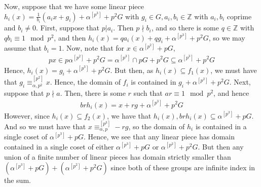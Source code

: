 \documentclass[a4paper,11pt]{article}
\newenvironment{claimproof}{\renewcommand{\qedsymbol}{$\blacksquare$}\proof} {\endproof} %
\newcommand{\nl}{\newline}
\begin{document}
\begin{claimproof}
    Now, suppose that we have some linear piece $h_i(x) = \frac{1}{b_i}(a_ix + 
    g_i) + \alpha^{[p^3]}+p^2G$ with $g_i\in G,a_i,b_i\in \mathbb{Z}$ with
    $a_i,b_i$ coprime and $b_i\neq 0$.
	\nl\nl
	First, suppose that $p|a_i$. Then $p\nmid b_i$, and so there is some $q\in 
    \mathbb{Z}$ with $qb_i \equiv 1 \mod p^2$, and then $h_i(x) = qa_i(x) + 
    qg_i + \alpha^{[p^3]}+p^2G$, so we may assume that $b_i = 1$. Now, note
    that for $x \in \alpha^{[p^2]}+pG$,
    \begin{align*}
        px \in p\alpha^{[p^2]}+p^2G = 
        \alpha^{[p^3]}\cap pG + p^2G \subseteq \alpha^{[p^3]}+p^2G
    \end{align*}
	Hence, $h_i(x) = g_i + \alpha^{[p^3]}+p^2G$. But then, as $h_i(x) 
    \subseteq f_1(x)$, we must have that $g_i \equiv_{\alpha, p^2}^{[p^2]} x$.
    Hence, the domain of $f_i$ is contained in $g_i + \alpha^{[p^2]}+p^2G$.
    \nl\nl
	Next, suppose that $p\nmid a$. Then, there is some $r$ such that $ar 
    \equiv 1 \mod p^2$, and hence
    \begin{align*}
        brh_i(x) = x + rg + \alpha^{[p^3]}+p^2G 
    \end{align*}
    \noindent However, since $h_i(x) \subseteq f_2(x)$, we have that
    $h_i(x),brh_i(x)\subseteq \alpha^{[p^3]}+pG$. And so we must have that $x 
    \equiv_{\alpha,p}^{[p^3]} -rg $, so the domain of $h_i$ is contained in a
    single coset of $\alpha^{[p^3]}+pG$.
	\nl\nl
	Hence, we see that any linear piece has domain contained in a single coset
    of either $\alpha^{[p^3]}+pG$ or $\alpha^{[p^2]}+p^2G$. But then any union
    of a finite number of linear pieces has domain strictly smaller than
    $(\alpha^{[p^3]}+pG)+(\alpha^{[p^2]}+p^2G)$ since both of these groups are
    infinite index in the sum.
\end{claimproof}
\end{document}
